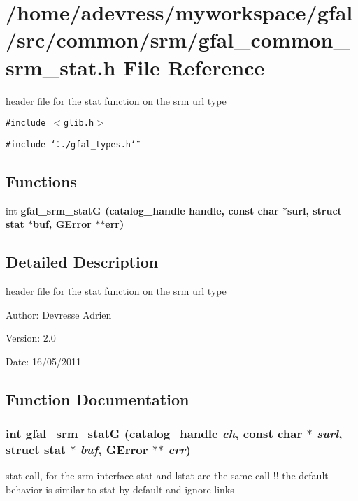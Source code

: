 \section{/home/adevress/myworkspace/gfal/src/common/srm/gfal\_\-common\_\-srm\_\-stat.h File Reference}
\label{gfal__common__srm__stat_8h}
header file for the stat function on the srm url type 

{\tt \#include $<$glib.h$>$}\par
{\tt \#include \char`\"{}../gfal\_\-types.h\char`\"{}}\par
\subsection*{Functions}
\begin{CompactItemize}
\item 
int \bf{gfal\_\-srm\_\-stat\-G} (catalog\_\-handle handle, const char $\ast$surl, struct stat $\ast$buf, GError $\ast$$\ast$err)
\end{CompactItemize}


\subsection{Detailed Description}
header file for the stat function on the srm url type 

\begin{Desc}
\item[Author:]Devresse Adrien \end{Desc}
\begin{Desc}
\item[Version:]2.0 \end{Desc}
\begin{Desc}
\item[Date:]16/05/2011 \end{Desc}


\subsection{Function Documentation}
\subsubsection{\setlength{\rightskip}{0pt plus 5cm}int gfal\_\-srm\_\-stat\-G (catalog\_\-handle {\em ch}, const char $\ast$ {\em surl}, struct stat $\ast$ {\em buf}, GError $\ast$$\ast$ {\em err})}\label{gfal__common__srm__stat_8h_f7d374066f088638c5afe77ef8a1dd7c}


stat call, for the srm interface stat and lstat are the same call !! the default behavior is similar to stat by default and ignore links 